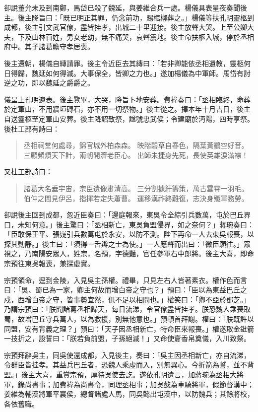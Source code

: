 卻說董允未及到南鄭，馬岱已殺了魏延，與姜維合兵一處。楊儀具表星夜奏聞後主。後主降旨曰：「既已明正其罪，仍念前功，賜棺槨葬之。」楊儀等扶孔明靈柩到成都，後主引文武官僚，盡皆挂孝，出城二十里迎接。後主放聲大哭。上至公卿大夫，下及山林百姓，男女老幼，無不痛哭，哀聲震地。後主命扶柩入城，停於丞相府中。其子諸葛瞻守孝居喪。

後主還朝，楊儀自縳請罪。後主令近臣去其縳曰：「若非卿能依丞相遺教，靈柩何日得歸，魏延如何得滅。大事保全，皆卿之力也。」遂加楊儀為中軍師。馬岱有討逆之功，即以魏延之爵爵之。

儀呈上孔明遺表。後主覽畢，大哭，降旨卜地安葬。費褘奏曰：「丞相臨終，命葬於定軍山，不用牆垣磚石，亦不用一切祭物。」後主從之。擇本年十月吉日，後主自送靈柩至定軍山安葬。後主降詔致祭，諡號忠武侯；令建廟於沔陽，四時享祭。後杜工部有詩曰：

\begin{quote}
丞相祠堂何處尋，錦官城外柏森森。
映階碧草自春色，隔葉黃鸝空好音。
三顧頻煩天下計，兩朝開濟老臣心。
出師未捷身先死，長使英雄淚滿襟！
\end{quote}

又杜工部詩曰：

\begin{quote}
諸葛大名垂宇宙，宗臣遺像肅清高。
三分割據紆籌策，萬古雲霄一羽毛。
伯仲之間見伊呂，指揮若定失蕭曹。
運移漢祚終難復，志決身殲軍務勞。
\end{quote}

卻說後主回到成都，忽近臣奏曰：「邊庭報來，東吳令全綜引兵數萬，屯於巴丘界口，未知何意。」後主驚曰：「丞相新亡，東吳負盟侵界，如之奈何？」蔣琬奏曰：「臣敢保王平、張嶷引兵數萬屯於永安，以防不測。陛下再命一人去東吳報喪，以探其動靜。」後主曰：「須得一舌辯之士為使。」一人應聲而出曰：「微臣願往。」眾視之，乃南陽安眾人，姓宗，名預，字德豔，官任參軍右中郎將。後主大喜，即命宗預往東吳報喪，兼探虛實。

宗預領命，逕到金陵，入見吳主孫權。禮畢，只見左右人皆著素衣。權作色而言曰：「吳、蜀已為一家，卿主何故而增白帝之守也？」預曰：「臣以為東益巴丘之戍，西增白帝之守，皆事勢宜然，俱不足以相問也。」權笑曰：「卿不亞於鄧芝。」乃謂宗預曰：「朕聞諸葛丞相歸天，每日流涕，令官僚盡皆挂孝。朕恐魏人乘喪取蜀，故增巴丘守兵萬人，以為救援，別無他意也。」預頓首拜謝。權曰：「朕既許以同盟，安有背義之理？」預曰：「天子因丞相新亡，特命臣來報喪。」權遂取金鈚箭一技折之，設誓曰：「朕若負前盟，子孫絕滅！」又命使齎香帛奠儀，入川致祭。

宗預拜辭吳主，同吳使還成都，入見後主，奏曰：「吳主因丞相新亡，亦自流涕，令群臣皆挂孝。其益兵巴丘者，恐魏人乘虛而入，別無異心。今折箭為誓，並不背盟。」後主大喜，重賞宗預，厚待吳使去訖。遂依孔明遺言，加蔣琬為丞相大將軍，錄尚書事；加費褘為尚書令，同理丞相事；加吳懿為車騎將軍，假節督漢中；姜維為輔漢將軍平襄侯，總督諸處人馬，同吳懿出屯漢中，以防魏兵；其餘將校，各依舊職。

